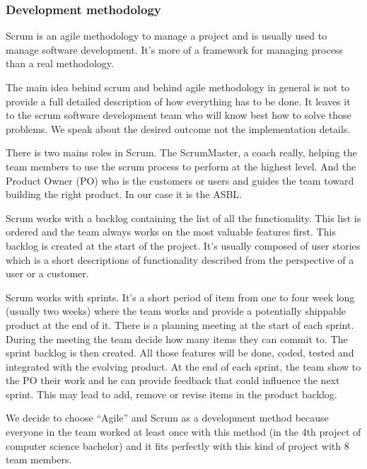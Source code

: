 \subsubsection{Development methodology}
Scrum is an agile methodology to manage a project and is usually used to manage software development. It's more of a framework for managing process than a real methodology.\newline

The main idea behind scrum and behind agile methodology in general is not to provide a full detailed description of how everything has to be done. It leaves it to the scrum software development team who will know best how to solve those problems. We speak about the desired outcome not the implementation details.\newline

There is two mains roles in Scrum. The ScrumMaster, a coach really, helping the team members to use the scrum process to perform at the highest level. And the Product Owner (PO) who is the customers or users and guides the team toward building the right product. In our case it is the ASBL.\newline

Scrum works with a backlog containing the list of all the functionality. This list is ordered and the team always works on the most valuable features first. This backlog is created at the start of the project. It's usually composed of user stories which is a short descriptions of functionality described from the perspective of a user or a customer.\newline

Scrum works with sprints. It's a short period of item from one to four week long (usually two weeks) where the team works and provide a potentially shippable product at the end of it. There is a planning meeting at the start of each sprint. During the meeting the team decide how many items they can commit to. The sprint backlog is then created. All those features will be done, coded, tested and integrated with the evolving product. At the end of each sprint, the team show to the PO their work and he can provide feedback that could influence the next sprint. This may lead to add, remove or revise items in the product backlog.\newline

We decide to choose \enquote{Agile} and Scrum as a development method because
everyone in the team worked at least once with this method (in the 4th
project of computer science bachelor) and it fits perfectly with this
kind of project with 8 team members.\newline

